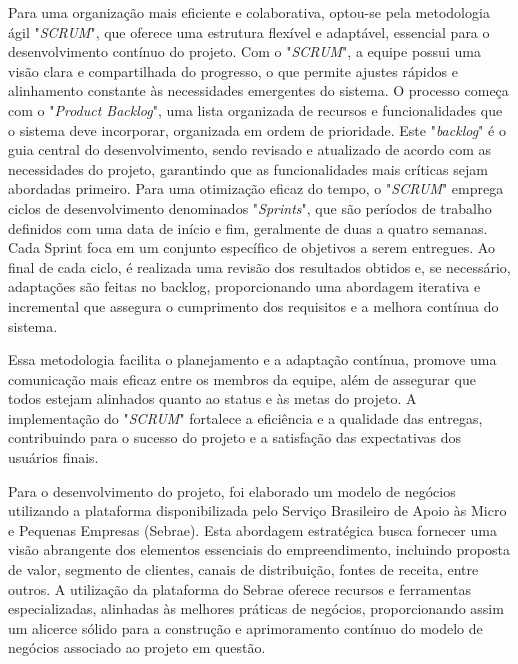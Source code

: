 Para uma organização mais eficiente e colaborativa, optou-se pela metodologia ágil "\textit{SCRUM}", que oferece uma estrutura flexível e adaptável, essencial para o desenvolvimento contínuo do projeto. Com o "\textit{SCRUM}", a equipe possui uma visão clara e compartilhada do progresso, o que permite ajustes rápidos e alinhamento constante às necessidades emergentes do sistema. O processo começa com o  "\textit{Product Backlog}", uma lista organizada de recursos e funcionalidades que o sistema deve incorporar, organizada em ordem de prioridade. Este "\textit{backlog}" é o guia central do desenvolvimento, sendo revisado e atualizado de acordo com as necessidades do projeto, garantindo que as funcionalidades mais críticas sejam abordadas primeiro. Para uma otimização eficaz do tempo, o "\textit{SCRUM}" emprega ciclos de desenvolvimento denominados "\textit{Sprints}", que são períodos de trabalho definidos com uma data de início e fim, geralmente de duas a quatro semanas. Cada Sprint foca em um conjunto específico de objetivos a serem entregues. Ao final de cada ciclo, é realizada uma revisão dos resultados obtidos e, se necessário, adaptações são feitas no backlog, proporcionando uma abordagem iterativa e incremental que assegura o cumprimento dos requisitos e a melhora contínua do sistema.

Essa metodologia facilita o planejamento e a adaptação contínua, promove uma comunicação mais eficaz entre os membros da equipe, além de assegurar que todos estejam alinhados quanto ao status e às metas do projeto. A implementação do "\textit{SCRUM}" fortalece a eficiência e a qualidade das entregas, contribuindo para o sucesso do projeto e a satisfação das expectativas dos usuários finais.

Para o desenvolvimento do projeto, foi elaborado um modelo de negócios utilizando a plataforma disponibilizada pelo Serviço Brasileiro de Apoio às Micro e Pequenas Empresas (Sebrae). Esta abordagem estratégica busca fornecer uma visão abrangente dos elementos essenciais do empreendimento, incluindo proposta de valor, segmento de clientes, canais de distribuição, fontes de receita, entre outros. A utilização da plataforma do Sebrae oferece recursos e ferramentas especializadas, alinhadas às melhores práticas de negócios, proporcionando assim um alicerce sólido para a construção e aprimoramento contínuo do modelo de negócios associado ao projeto em questão.

